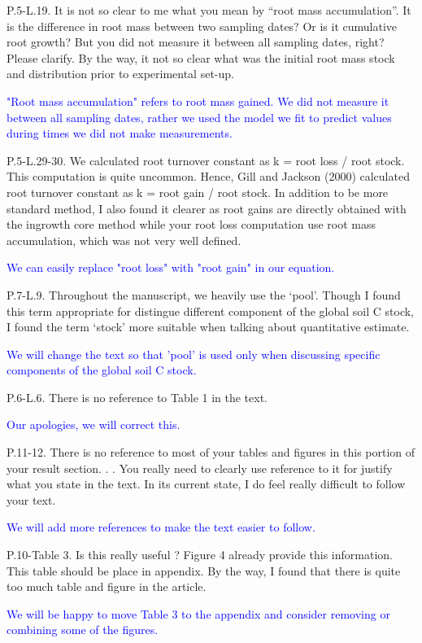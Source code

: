 \documentclass[]{article}
\begin{document}
P.5-L.19. It is not so clear to me what you mean by ``root mass
accumulation''. It is the difference in root mass between two sampling
dates? Or is it cumulative root growth? But you did not measure it
between all sampling dates, right? Please clarify. By the way, it not so
clear what was the initial root mass stock and distribution prior to
experimental set-up.

\textcolor{blue}{"Root mass accumulation" refers to root mass gained. We did not measure it between all sampling dates, rather we used the model we fit to predict values during times we did not make measurements.}

P.5-L.29-30. We calculated root turnover constant as k = root loss /
root stock. This computation is quite uncommon. Hence, Gill and Jackson
(2000) calculated root turnover constant as k = root gain / root stock.
In addition to be more standard method, I also found it clearer as root
gains are directly obtained with the ingrowth core method while your
root loss computation use root mass accumulation, which was not very
well defined.

\textcolor{blue}{We can easily replace "root loss" with "root gain" in our equation.}

P.7-L.9. Throughout the manuscript, we heavily use the `pool'. Though I
found this term appropriate for distingue different component of the
global soil C stock, I found the term `stock' more suitable when talking
about quantitative estimate.

\textcolor{blue}{We will change the text so that 'pool' is used only when discussing specific components of the global soil C stock.}

P.6-L.6. There is no reference to Table 1 in the text.

\textcolor{blue}{Our apologies, we will correct this.}

P.11-12. There is no reference to most of your tables and figures in
this portion of your result section. . . You really need to clearly use
reference to it for justify what you state in the text. In its current
state, I do feel really difficult to follow your text.

\textcolor{blue}{We will add more references to make the text easier to follow.}

P.10-Table 3. Is this really useful ? Figure 4 already provide this
information. This table should be place in appendix. By the way, I found
that there is quite too much table and figure in the article.

\textcolor{blue}{We will be happy to move Table 3 to the appendix and consider removing or combining some of the figures.}
\end{document}
